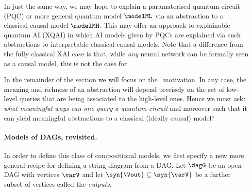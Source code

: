 \documentclass{article}
\begin{document}
\begin{enumerate}
In just the same way, we may hope to explain a paramaterised quantum circuit (PQC) or more general quantum model $\modelML$ via an abstraction to a classical causal model $\modelMH$. This may offer an approach to explainable quantum AI (XQAI) in which AI models given by PQCs are explained via such abstractions to interpretable classical causal models. 
 Note that a difference from the fully classical XAI case is that, while \emph{any} neural network can be formally seen as a causal model, this is not the case for    
\end{enumerate}

In the remainder of the section we will focus on the \ motivation. In any case, the meaning and richness of an abstraction will depend precisely on the set of low-level queries  that are being associated to the high-level ones. Hence we must ask: \emph{what meaningful ways can one query a quantum circuit} 
and moreover such that it can yield meaningful abstractions to a classical (ideally causal) model?\   


\paragraph{Models of DAGs, revisited.} 
In order to define this class of compositional models, 
we first specify a new more general recipe for defining a string diagram from a DAG.  
Let $\dagG$ be an open DAG with vertices $\varV$ and let $\syn{\Vout} \subseteq \syn{\varV}$ be a further subset of vertices called the \emph{outputs}. 
\end{document}
